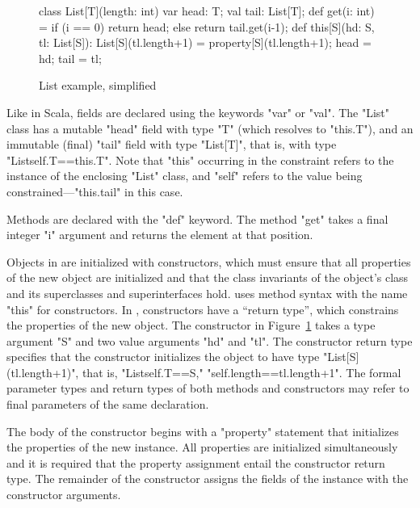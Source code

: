 \begin{figure}
{\footnotesize
\begin{xtennoindent}
class List[T](length: int) {
  var head: T;
  val tail: List[T];
  def get(i: int) = {
    if (i == 0) return head;
    else return tail.get(i-1);
  }
  def this[S](hd: S, tl: List[S]): List[S](tl.length+1) = {
    property[S](tl.length+1);
    head = hd; tail = tl;
  }
}
\end{xtennoindent}
}
\caption{List example, simplified}
\label{fig:list0}
\end{figure}

Like in Scala, fields are declared using the keywords \xcd"var"
or \xcd"val".  The \xcd"List" class has a mutable \xcd"head"
field with type \xcd"T" (which resolves to \xcd"this.T"), and an
immutable (final) \xcd"tail" field with type \xcd"List[T]", that
is, with type \xcd"List{self.T==this.T}".  Note that \xcd"this" occurring
in the constraint refers to the instance of the enclosing
\xcd"List" class,
and \xcd"self" refers to the value being
constrained---\xcd"this.tail" in this case.

Methods are declared with the \xcd"def" keyword.
The method \xcd"get" takes a final integer \xcd"i" argument
and returns the element at that position.

Objects in \Xten{} are initialized with constructors, which
must ensure that all properties of the new object
are initialized and that the class invariants of the object's
class and its superclasses and superinterfaces hold.
\Xten{} uses method syntax with the name
\xcd"this" for constructors.
In \Xten{}, constructors have a ``return type'', which constrains
the properties of the new object.  The constructor in
Figure~\ref{fig:list0} takes a type argument \xcd"S"
and two value arguments \xcd"hd" and \xcd"tl".  The constructor
return type specifies that the constructor initializes the
object to have type \xcd"List[S](tl.length+1)", that is,
\xcd"List{self.T==S," \xcd"self.length==tl.length+1}".
The formal parameter types and return types of both methods and
constructors may refer to final parameters of the same
declaration.

The body of the constructor
begins with a \xcd"property" statement that initializes the
properties of the new instance.  All properties are initialized
simultaneously and it is required that the property assignment
entail the constructor return type.
The remainder of the constructor assigns the fields of the
instance with the constructor arguments.

